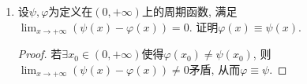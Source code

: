 \begin{1a}
\begin{enumerate}
证明\(\{x_n\},\{y_n\}\)收敛并求其极限.
\begin{proof}
取\(z'_n=(x_n,y_n+1)\)，则
\[|z'_n|^2=x_n^2+y_n^2+2y_n+1=2+\sin\frac{1}{n}\leqslant 3.\]
从而\(\{z'_n\}\)是有界列, 于是\(z_n=(x_n,y_n)\)也有界, 取\(\{z_n\}\)的一收敛子列\(\{z_{n_k}\}\), 其收敛于\(z=(x,y)\)且满足
\[\begin{cases}
    x^2+y^2+2y=1,\\
    x+y=1.
\end{cases}\]解得\(x=1,y=0\).
\end{proof}
\item 设\(\psi,\varphi\)为定义在\((0,+\infty)\)上的周期函数, 满足\(\lim_{x\rightarrow+\infty}\left(\psi(x)-\varphi(x)\right)=0\). 证明\(\varphi(x)\equiv\psi(x)\).
\begin{proof}
若\(\exists x_0\in (0,+\infty)\)使得\(\varphi(x_0)\ne\psi(x_0)\), 则\(\lim_{x\rightarrow+\infty}\left(\psi(x)-\varphi(x)\right)\ne 0\)矛盾, 从而\(\varphi\equiv\psi\).
\end{proof}
\end{enumerate}
\end{1a}
